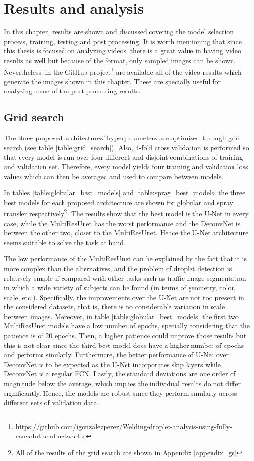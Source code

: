 \chapter{Results and analysis}\label{chap:results}
In this chapter, results are shown and discussed covering the model selection process, training, testing and post processing. It is worth mentioning that since this thesis is focused on analyzing videos, there is a great value in having video results as well but because of the format, only sampled images can be shown. Nevertheless, in the GitHub project\footnote{\url{https://github.com/igonzalezperez/Welding-droplet-analysis-using-fully-convolutional-networks}.} are available all of the video results which generate the images shown in this chapter. These are specially useful for analyzing some of the post processing results.


\section{Grid search}
The three proposed architectures' hyperparameters are optimized through grid search (see table \ref{table:grid_search}). Also, 4-fold cross validation is performed so that every model is run over four different and disjoint combinations of training and validation set. Therefore, every model yields four training and validation loss values which can then be averaged and used to compare between models. 

In tables \ref{table:globular_best_models} and \ref{table:spray_best_models} the three best models for each proposed architecture are shown for globular and spray transfer respectively\footnote{All of the results of the grid search are shown in Appendix \ref{appendix_gs}}. The results show that the best model is the U-Net in every case, while the MultiResUnet has the worst performance and the DeconvNet is between the other two, closer to the MultiResUnet. Hence the U-Net architecture seems suitable to solve the task at hand. 

The low performance of the MultiResUnet can be explained by the fact that it is more complex than the alternatives, and the problem of droplet detection is relatively simple if compared with other tasks such as traffic image segmentation in which a wide variety of subjects can be found (in terms of geometry, color, scale, etc.). Specifically, the improvements over the U-Net are not too present in the considered datasets, that is, there is no considerable variation in scale between images. Moreover, in table \ref{table:globular_best_models} the first two MultiResUnet models have a low number of epochs, specially considering that the patience is of 20 epochs. Then, a higher patience could improve those results but this is not clear since the third best model does have a higher number of epochs and performs similarly. Furthermore, the better performance of U-Net over DeconvNet is to be expected as the U-Net incorporates skip layers while DeconvNet is a regular FCN. Lastly, the standard deviations are one order of magnitude below the average, which implies the individual results do not differ significantly. Hence, the models are robust since they perform similarly across different sets of validation data.


